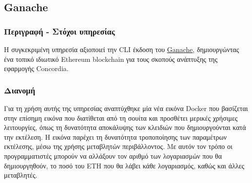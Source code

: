 \subsection{Ganache} \label{subsection:4-3-6-ganache-service}

\subsubsection{Περιγραφή - Στόχοι υπηρεσίας}

Η συγκεκριμένη υπηρεσία αξιοποιεί την CLI έκδοση του \hyperref[subsection:4-2-3-2-ganache]{Ganache}, δημιουργώντας ένα τοπικό ιδιωτικό Ethereum blockchain για τους σκοπούς ανάπτυξης της εφαρμογής Concordia.

\subsubsection{Διανομή}

Για τη χρήση αυτής της υπηρεσίας αναπτύχθηκε μία νέα εικόνα Docker που βασίζεται στην επίσημη εικόνα που διατίθεται από τη σουίτα και προσθέτει μερικές χρήσιμες λειτουργίες, όπως τη δυνατότητα αποκάλυψης των κλειδιών που δημιουργούνται κατά την εκτέλεση. Η εικόνα παρέχει τη δυνατότητα τροποποίησης των παραμέτρων εκτέλεσης, μέσω της χρήσης μεταβλητών περιβάλλοντος. Με αυτόν τον τρόπο οι προγραμματιστές μπορούν να αλλάξουν τον αριθμό των λογαριασμών που θα δημιουργηθούν, το ποσό του ETH που θα λάβει κάθε λογαριασμός, καθώς και άλλες μεταβλητές.